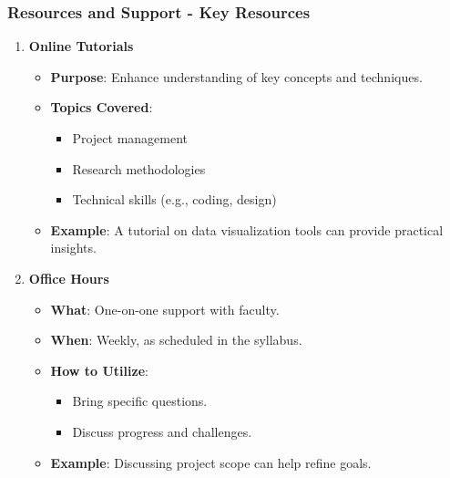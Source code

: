 \documentclass[aspectratio=169]{beamer}
\begin{document}
\begin{frame}[fragile]
    \frametitle{Resources and Support - Key Resources}
    \begin{enumerate}
        \item \textbf{Online Tutorials}
        \begin{itemize}
            \item \textbf{Purpose}: Enhance understanding of key concepts and techniques.
            \item \textbf{Topics Covered}:
            \begin{itemize}
                \item Project management
                \item Research methodologies
                \item Technical skills (e.g., coding, design)
            \end{itemize}
            \item \textbf{Example}: A tutorial on data visualization tools can provide practical insights.
        \end{itemize}
        
        \item \textbf{Office Hours}
        \begin{itemize}
            \item \textbf{What}: One-on-one support with faculty.
            \item \textbf{When}: Weekly, as scheduled in the syllabus.
            \item \textbf{How to Utilize}:
            \begin{itemize}
                \item Bring specific questions.
                \item Discuss progress and challenges.
            \end{itemize}
            \item \textbf{Example}: Discussing project scope can help refine goals.
        \end{itemize}
    \end{enumerate}
\end{frame}
\end{document}
